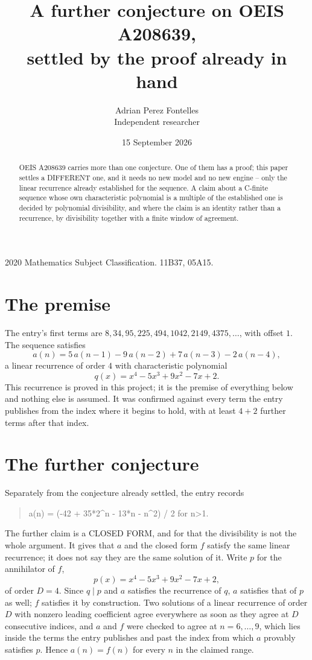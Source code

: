 \documentclass[11pt,a4paper]{article}
\title{A further conjecture on OEIS A208639,\\ \large settled by the proof already in hand}
\author{Adrian Perez Fontelles\\ \small Independent researcher}
\date{15 September 2026}
\theoremstyle{plain}
\theoremstyle{definition}
\begin{document}
\maketitle

\begin{abstract}
OEIS A208639 carries more than one conjecture. One of them has a proof; this paper settles a
DIFFERENT one, and it needs no new model and no new engine -- only the linear recurrence already
established for the sequence. A claim about a C-finite sequence whose own characteristic
polynomial is a multiple of the established one is decided by polynomial divisibility, and where
the claim is an identity rather than a recurrence, by divisibility together with a finite window
of agreement.
\end{abstract}

\noindent\small 2020 Mathematics Subject Classification. 11B37, 05A15.\normalsize

\section{The premise}

The entry's first terms are $8, 34, 95, 225, 494, 1042, 2149, 4375,\dots$, with offset $1$. The sequence satisfies
\[
  a(n)=5\,a(n-1) - 9\,a(n-2) + 7\,a(n-3) - 2\,a(n-4) ,
\]
a linear recurrence of order $4$ with characteristic polynomial
\[
  q(x)=x^{4} - 5 x^{3} + 9 x^{2} - 7 x + 2 .
\]
This recurrence is proved in this project; it is the premise of everything below and nothing else is assumed.
It was confirmed against every term the entry publishes from the index where it begins to hold,
with at least $4+2$ further terms after that index.

\section{The further conjecture}

Separately from the conjecture already settled, the entry records

\begin{quote}\raggedright a(n) = (-42 + 35*2\^{}n - 13*n - n\^{}2) / 2 for n>1.\end{quote}

The further claim is a CLOSED FORM, and for that the divisibility is not the whole argument. It
gives that $a$ and the closed form $f$ satisfy the same linear recurrence; it does not say they
are the same solution of it. Write $p$ for the annihilator of $f$,
\[
  p(x)=x^{4} - 5 x^{3} + 9 x^{2} - 7 x + 2 ,
\]
of order $D=4$. Since $q\mid p$ and $a$ satisfies the recurrence of $q$, $a$ satisfies that of
$p$ as well; $f$ satisfies it by construction. Two solutions of a linear recurrence of order $D$
with nonzero leading coefficient agree everywhere as soon as they agree at $D$ consecutive
indices, and $a$ and $f$ were checked to agree at $n=6,\dots,9$,
which lies inside the terms the entry publishes and past the index from which $a$ provably
satisfies $p$. Hence $a(n)=f(n)$ for every $n$ in the claimed range.
\end{document}
